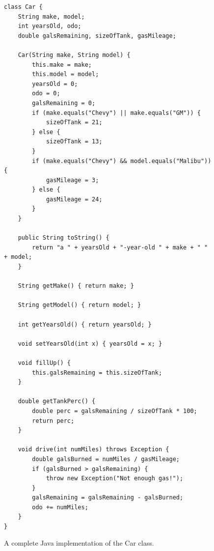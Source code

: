 \begin{figure}
\begin{Verbatim}[fontsize=\scriptsize,frame=single]
class Car {
    String make, model;
    int yearsOld, odo;
    double galsRemaining, sizeOfTank, gasMileage;

    Car(String make, String model) {
        this.make = make;
        this.model = model;
        yearsOld = 0;
        odo = 0;
        galsRemaining = 0;
        if (make.equals("Chevy") || make.equals("GM")) {
            sizeOfTank = 21;
        } else {
            sizeOfTank = 13;
        }
        if (make.equals("Chevy") && model.equals("Malibu")) {
            gasMileage = 3;
        } else {
            gasMileage = 24;
        }
    }

    public String toString() {
        return "a " + yearsOld + "-year-old " + make + " " + model;
    }

    String getMake() { return make; }

    String getModel() { return model; }

    int getYearsOld() { return yearsOld; }

    void setYearsOld(int x) { yearsOld = x; }

    void fillUp() {
        this.galsRemaining = this.sizeOfTank;
    }

    double getTankPerc() {
        double perc = galsRemaining / sizeOfTank * 100;
        return perc;
    }

    void drive(int numMiles) throws Exception {
        double galsBurned = numMiles / gasMileage;
        if (galsBurned > galsRemaining) {
            throw new Exception("Not enough gas!");
        }
        galsRemaining = galsRemaining - galsBurned;
        odo += numMiles;
    }
}
\end{Verbatim}
\caption{A complete Java implementation of the Car class.}
\label{fig:carClassCode}
\end{figure}




